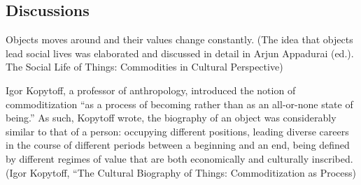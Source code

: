 






\subsection{Discussions}
Objects moves around and their values change constantly. (The idea that objects lead social lives was elaborated and discussed in detail in Arjun Appadurai (ed.). The Social Life of Things: Commodities in Cultural Perspective)

Igor Kopytoff, a professor of anthropology, introduced the notion of commoditization “as a process of becoming rather than as an all-or-none state of being.” As such, Kopytoff wrote, the biography of an object was considerably similar to that of a person: occupying different positions, leading diverse careers in the course of different periods between a beginning and an end, being defined by different regimes of value that are both economically and culturally inscribed. (Igor Kopytoff, “The Cultural Biography of Things: Commoditization as Process)

